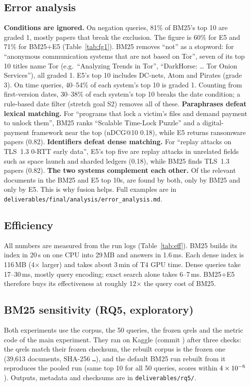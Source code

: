 \documentclass[10pt,a4paper]{article}
\newcommand{\inputor}[2]{\IfFileExists{#1}{}{#2}}
\begin{document}
\subsection{Error analysis}
\inputor{tables/fin_g1.tex}{}
\textbf{Conditions are ignored.} On negation queries, 81\% of BM25's top 10 are graded 1, mostly
papers that break the exclusion. The figure is 60\% for E5 and 71\% for BM25+E5 (Table~\ref{tab:fg1}).
BM25 removes ``not'' as a stopword: for ``anonymous communication systems that are not based on Tor'',
seven of its top 10 titles name Tor (e.g.\ ``Analyzing Trends in Tor'', ``DarkHorse: \ldots{} Tor Onion
Services''), all graded 1. E5's top 10 includes DC-nets, Atom and Pirates (grade 3). On time queries,
40--54\% of each system's top 10 is graded 1. Counting from first-version dates, 30--38\% of each
system's top 10 breaks the date condition; a rule-based date filter (stretch goal S2) removes all of these.
\textbf{Paraphrases defeat lexical matching.} For ``programs that lock a victim's files and demand
payment to unlock them'', BM25 ranks ``Scalable Time-Lock Puzzle'' and a digital-payment framework near
the top (nDCG@10 0.18), while E5 returns ransomware papers (0.82).
\textbf{Identifiers defeat dense matching.} For ``replay attacks on TLS~1.3 0-RTT early data'', E5's top
five are replay attacks in unrelated fields such as space launch and sharded ledgers (0.18), while BM25
finds TLS~1.3 papers (0.82).
\textbf{The two systems complement each other.} Of the relevant documents in the BM25 and E5 top 10s,
\finBoth{} are found by both, \finOnlyBM{} only by BM25 and \finOnlyE{} only by E5. This is why fusion
helps. Full examples are in \texttt{deliverables/final/analysis/error\_analysis.md}.

\subsection{Efficiency}
\inputor{tables/efficiency_prelim.tex}{}
All numbers are measured from the run logs (Table~\ref{tab:eff}). BM25 builds its index in 20\,s on one
CPU into 29\,MB and answers in 1.6\,ms. Each dense index is 116\,MB (4$\times$ larger) and takes about
3\,min of T4 GPU time. Dense queries take 17--30\,ms, mostly query encoding; exact search alone takes
6--7\,ms. BM25+E5 therefore buys its effectiveness at roughly 12$\times$ the query cost of BM25.

\subsection{BM25 sensitivity (RQ5, exploratory)}\label{sec:rq5}
Both experiments use the corpus, the 50 queries, the frozen qrels and the metric code of the main
experiment. They ran on Kaggle (commit \texttt{\rqCommit}) after three checks: the qrels match their frozen
checksum, the rebuilt corpus is the frozen one (39{,}613 documents, SHA-256 \texttt{\rqCorpusSha\ldots}), and
the default BM25 run rebuilt from it reproduces the pooled run (same top 10 for all 50 queries, scores within
$4\times10^{-6}$). Outputs, metadata and checksums are in \texttt{deliverables/rq5/}.
\end{document}
